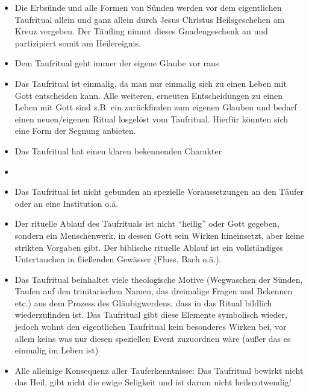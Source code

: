 \begin{itemize}
	\item Die Erbsünde und alle Formen von Sünden werden vor dem eigentlichen Taufritual allein und ganz allein durch Jesus Christus Heilsgeschehen am Kreuz vergeben. Der Täufling nimmt dieses Gnadengeschenk an und partizipiert somit am Heilereignis.
	\item Dem Taufritual geht immer der eigene Glaube vor raus
	\item Das Taufritual ist einmalig, da man nur einmalig sich zu einen Leben mit Gott entscheiden kann. Alle weiteren, erneuten Entscheidungen zu einen Leben mit Gott sind z.B. ein zurückfinden zum eigenen Glauben und bedarf einen neuen/eigenen Ritual losgelöst vom Taufritual. Hierfür könnten sich eine Form der Segnung anbieten.
	\item Das Taufritual hat einen klaren bekennenden Charakter
	\item \noindent{}
	\item Das Taufritual ist nicht gebunden an spezielle Voraussetzungen an den Täufer oder an eine Institution o.ä.
	\item Der rituelle Ablauf des Taufrituals ist nicht ``heilig'' oder Gott gegeben, sondern ein Menschenwerk, in dessen Gott sein Wirken hineinsetzt, aber keine strikten Vorgaben gibt. Der biblische rituelle Ablauf ist ein vollständiges Untertauchen in fließenden Gewässer (Fluss, Bach o.ä.).
	\item Das Taufritual beinhaltet viele theologische Motive (Wegwaschen der Sünden, Taufen auf den trinitarischen Namen, das dreimalige Fragen und Bekennen etc.) aus dem Prozess des Gläubigwerdens, dass in das Ritual bildlich wiederzufinden ist. Das Taufritual gibt diese Elemente symbolisch wieder, jedoch wohnt den eigentlichen Taufritual kein besonderes Wirken bei, vor allem keins was nur diesen speziellen Event zuzuordnen wäre (außer das es einmalig im Leben ist)
	\item Alle alleinige Konsequenz aller Tauferkenntnisse: Das Taufritual bewirkt nicht das Heil, gibt nicht die ewige Seligkeit und ist darum nicht heilsnotwendig!
\end{itemize}

